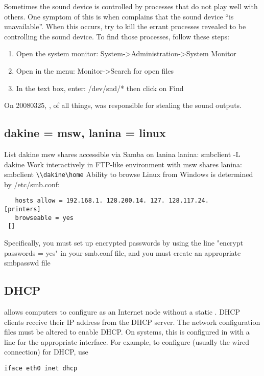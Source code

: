 \documentclass[12pt,twoside]{article}
\begin{document}
Sometimes the sound device is controlled by processes that
do not play well with others.
One symptom of this is when  complains that
the sound device ``is unavailable''.
When this occurs, try to kill the errant processes revealed
to be controlling the sound device.
To find those processes, follow these steps:
\begin{enumerate}
\item Open the system monitor: System->Administration->System Monitor
\item Open in the menu: Monitor->Search for open files
\item In the text box, enter: /dev/snd/* then click on Find
\end{enumerate}
On 20080325, , of all things, was responsible for
stealing the sound outputs.

\subsection{dakine = msw, lanina = linux}\label{sxn:smb}
List dakine msw shares accessible via Samba on lanina
lanina: smbclient -L dakine
Work interactively in FTP-like environment with msw shares
lanina: smbclient \verb'\\dakine\home'
Ability to browse Linux from Windows is determined by /etc/smb.conf:
\begin{verbatim}
   hosts allow = 192.168.1. 128.200.14. 127. 128.117.24.
[printers]
   browseable = yes
 [] 
\end{verbatim}
Specifically, you must set up encrypted passwords by using the line
"encrypt passwords = yes" in your smb.conf file, and you must create an
appropriate smbpasswd file

\subsection{DHCP}\label{sxn:dhcp}
 allows computers to
configure as an Internet node without a static .
DHCP clients receive their IP address from the DHCP server.
The network configuration files must be altered to enable DHCP.
On  systems, this is configured in
 with a line for the appropriate
interface. 
For example, to configure  (usually the wired
 connection) for DHCP, use
\begin{verbatim}
iface eth0 inet dhcp
\end{verbatim}
\end{document}
